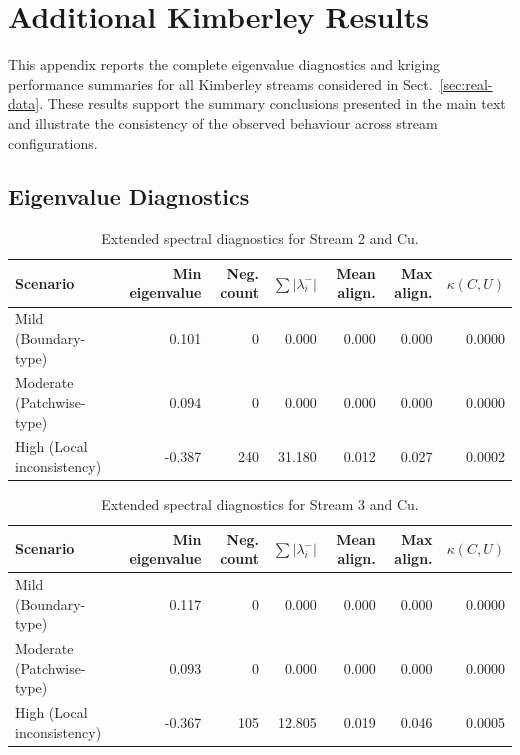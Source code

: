 \documentclass[smallextended]{svjour3}
\newcommand{\1}{\mathbf{1}}
\begin{document}
\clearpage
\section{Additional Kimberley Results}
\label{app:kimberley-results}

This appendix reports the complete eigenvalue diagnostics and kriging
performance summaries for all Kimberley streams considered in
Sect.~\ref{sec:real-data}. These results support the summary
conclusions presented in the main text and illustrate the consistency
of the observed behaviour across stream configurations.

\subsection*{Eigenvalue Diagnostics}

  
\begin{table}[htbp]
	\centering
	\caption{Extended spectral diagnostics for Stream 2 and Cu.}
	\label{tab:extended_eigen_stream_2_Cu}
	\begin{tabular}{lrrrrrr}
		\hline
		Scenario & Min eigenvalue & Neg. count & $\sum |\lambda_i^-|$ & Mean align. & Max align. & $\kappa(C,U)$ \\
		\hline
		Mild (Boundary-type) & 0.101 & 0 & 0.000 & 0.000 & 0.000 & 0.0000 \\
		Moderate (Patchwise-type) & 0.094 & 0 & 0.000 & 0.000 & 0.000 & 0.0000 \\
		High (Local inconsistency) & -0.387 & 240 & 31.180 & 0.012 & 0.027 & 0.0002 \\
		\hline
	\end{tabular}
\end{table}

\begin{table}[htbp]
	\centering
	\caption{Extended spectral diagnostics for Stream 3 and Cu.}
	\label{tab:extended_eigen_stream_3_Cu}
	\begin{tabular}{lrrrrrr}
		\hline
		Scenario & Min eigenvalue & Neg. count & $\sum |\lambda_i^-|$ & Mean align. & Max align. & $\kappa(C,U)$ \\
		\hline
		Mild (Boundary-type) & 0.117 & 0 & 0.000 & 0.000 & 0.000 & 0.0000 \\
		Moderate (Patchwise-type) & 0.093 & 0 & 0.000 & 0.000 & 0.000 & 0.0000 \\
		High (Local inconsistency) & -0.367 & 105 & 12.805 & 0.019 & 0.046 & 0.0005 \\
		\hline
	\end{tabular}
\end{table}
\end{document}
